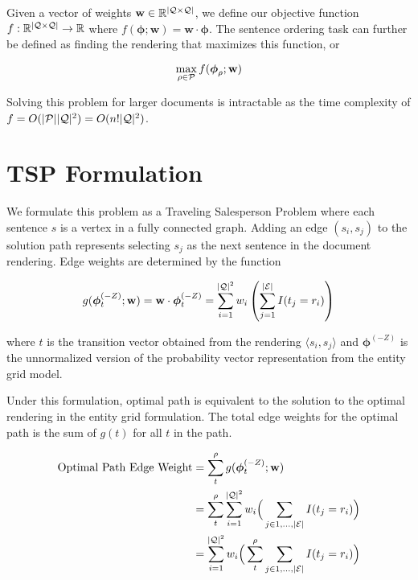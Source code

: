 \documentclass{article}
\newcommand{\entities}{{\cal E}}
\newcommand{\roles}{{\cal Q}}
\newcommand{\tv}{t}
\newcommand{\sent}{s}
\newcommand{\weight}{\mathbf{w}}
\newcommand{\rendering}{\rho}
\newcommand{\renderings}{{\cal P}}
\newcommand{\obj}{f}
\begin{document}

Given a vector of weights $\mathbf{w} \in \mathbb{R}^{|\roles\times\roles|}$, we define our objective function $\obj : \mathbb{R}^{|\roles\times\roles|}  \rightarrow \mathbb{R}$ where $\obj(\boldsymbol{\phi};\weight) = \weight\cdot\boldsymbol{\phi}$. 
The sentence ordering task can further be defined as finding the rendering that maximizes this function, or

\begin{equation}
\max_{\rendering \in \renderings} \obj(\boldsymbol{\phi}_\rendering ; \weight )
\end{equation}



Solving this problem for larger documents is intractable as the time complexity of $\obj = O(|\renderings||\roles|^2) = O(n!|\roles|^2)$. 


\section{TSP Formulation}
We formulate this problem as a Traveling Salesperson Problem where each sentence $\sent$ is a vertex in a fully connected graph. 
Adding an edge $(\sent_i,\sent_j)$ to the solution path represents selecting $\sent_j$ as the next sentence in the document rendering. 
Edge weights are determined by the function

\begin{equation}
g(\boldsymbol{\phi}^{(-Z)}_\tv;\weight) = \weight\cdot \boldsymbol{\phi}^{(-Z)}_\tv = \sum^{|\roles|^2}_{i=1} w_i \left( \sum_{j = 1}^{|\entities|} I(\tv_{j}= r_i) \right)
\end{equation}

\noindent
where $\tv$ is the transition vector obtained from the rendering $\langle \sent_i,\sent_j \rangle$ and $\boldsymbol{\phi}^{(-Z)}$ is the unnormalized version of the probability vector representation from the entity grid model.


Under this formulation, optimal path is equivalent to the solution to the optimal rendering in the entity grid formulation. 
The total edge weights for the optimal path is the sum of $g(\tv)$ for all $\tv$ in the path.

\begin{equation*}
\begin{split}
\textrm{Optimal Path Edge Weight} &= \sum^\rendering_{t} g(\boldsymbol{\phi}^{(-Z)}_\tv;\weight)\\
& = \sum^\rendering_{t} \sum^{|\roles|^2}_{i=1} w_i \Big( \sum_{j\in1,\ldots,|\entities|} I(\tv_{j}= r_i) \Big)\\
& = \sum^{|\roles|^2}_{i=1} w_i \Big( \sum^\rendering_{t} \sum_{j\in1,\ldots,|\entities|} I(\tv_{j}= r_i) \Big)\\
\end{split}
\end{equation*}
\end{document}
